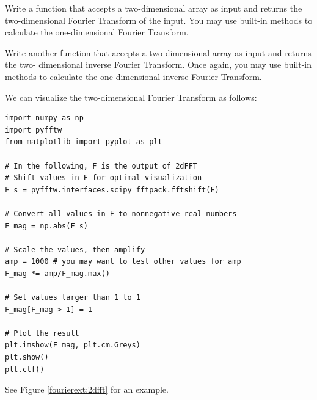 \begin{problem}
Write a function  that accepts a two-dimensional array as input and returns the two-dimensional
Fourier Transform of the input. You may use built-in methods to calculate the one-dimensional Fourier
Transform.

Write another function  that accepts a two-dimensional array as input and returns the two-
dimensional inverse Fourier Transform. Once again,  you may use built-in methods to calculate the
one-dimensional inverse Fourier Transform.
\end{problem}

We can visualize the two-dimensional Fourier Transform as follows:
\begin{lstlisting}
import numpy as np
import pyfftw
from matplotlib import pyplot as plt

# In the following, F is the output of 2dFFT
# Shift values in F for optimal visualization
F_s = pyfftw.interfaces.scipy_fftpack.fftshift(F)

# Convert all values in F to nonnegative real numbers
F_mag = np.abs(F_s)

# Scale the values, then amplify
amp = 1000 # you may want to test other values for amp
F_mag *= amp/F_mag.max()

# Set values larger than 1 to 1
F_mag[F_mag > 1] = 1

# Plot the result
plt.imshow(F_mag, plt.cm.Greys)
plt.show()
plt.clf()
\end{lstlisting}
See Figure \ref{fourierext:2dfft} for an example.


